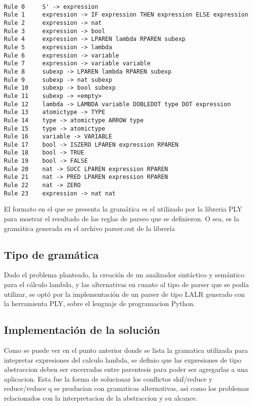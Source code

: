 \begin{verbatim}
  
Rule 0     S' -> expression
Rule 1     expression -> IF expression THEN expression ELSE expression
Rule 2     expression -> nat
Rule 3     expression -> bool
Rule 4     expression -> LPAREN lambda RPAREN subexp
Rule 5     expression -> lambda
Rule 6     expression -> variable
Rule 7     expression -> variable variable
Rule 8     subexp -> LPAREN lambda RPAREN subexp
Rule 9     subexp -> nat subexp
Rule 10    subexp -> bool subexp
Rule 11    subexp -> <empty>
Rule 12    lambda -> LAMBDA variable DOBLEDOT type DOT expression
Rule 13    atomictype -> TYPE
Rule 14    type -> atomictype ARROW type
Rule 15    type -> atomictype
Rule 16    variable -> VARIABLE
Rule 17    bool -> ISZERO LPAREN expression RPAREN
Rule 18    bool -> TRUE
Rule 19    bool -> FALSE
Rule 20    nat -> SUCC LPAREN expression RPAREN
Rule 21    nat -> PRED LPAREN expression RPAREN
Rule 22    nat -> ZERO
Rule 23    expression -> nat nat

\end{verbatim}

El formato en el que se presenta la gramática es el utilizado por la libreria PLY para mostrar 
el resultado de las reglas de parseo que se definieron. O sea, es la gramática generada en el 
archivo parser.out de la librería

\subsection{Tipo de gramática}

Dado el problema planteado, la creación de un analizador sintáctico y semántico para el cálculo lambda, 
y las alternativas en cuanto al tipo de parser que se podía utilizar, se optó por la implementación de 
un parser de tipo LALR generado con la herramienta PLY, sobre el lenguaje de programacion Python.

\subsection{Implementación de la solución}

Como se puede ver en el punto anterior donde se lista la gramatica utilizada para intepretar expresiones del calculo lambda, se definio que las expresiones de tipo abstraccion deben ser encerradas entre parentesis para poder ser agregarlas a una aplicacion. Esta fue la forma de solucionar los conflictos shif/reduce y reduce/reduce q se producian con gramaticas alternativas, asi como los problemas relacionados con la interpretacion de la abstraccion y su alcance. 

